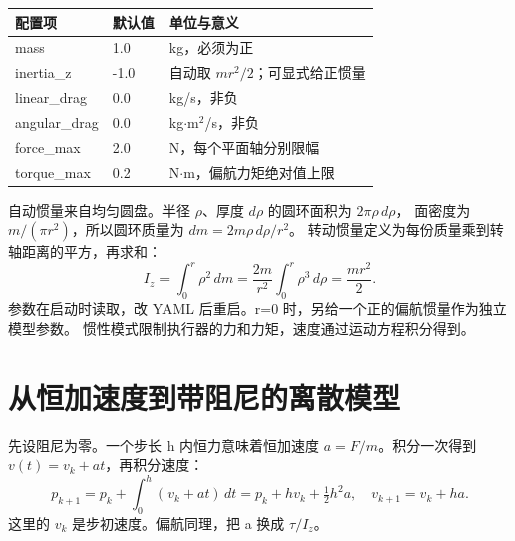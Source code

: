 \begin{center}
\begin{tabular}{lll}
\toprule
配置项 & 默认值 & 单位与意义\\
\midrule
mass & 1.0 & kg，必须为正\\
inertia\_z & -1.0 & 自动取 $mr^2/2$；可显式给正惯量\\
linear\_drag & 0.0 & kg/s，非负\\
angular\_drag & 0.0 & kg$\cdot$m$^2$/s，非负\\
force\_max & 2.0 & N，每个平面轴分别限幅\\
torque\_max & 0.2 & N$\cdot$m，偏航力矩绝对值上限\\
\bottomrule
\end{tabular}
\end{center}
自动惯量来自均匀圆盘。半径 $\rho$、厚度 $d\rho$ 的圆环面积为 $2\pi\rho\,d\rho$，
面密度为 $m/(\pi r^2)$，所以圆环质量为 $dm=2m\rho\,d\rho/r^2$。
转动惯量定义为每份质量乘到转轴距离的平方，再求和：
\begin{equation}
I_z=\int_0^r\rho^2\,dm=\frac{2m}{r^2}\int_0^r\rho^3\,d\rho=\frac{mr^2}{2}.
\end{equation}
参数在启动时读取，改 YAML 后重启。r=0 时，另给一个正的偏航惯量作为独立模型参数。
惯性模式限制执行器的力和力矩，速度通过运动方程积分得到。

\section{从恒加速度到带阻尼的离散模型}
先设阻尼为零。一个步长 h 内恒力意味着恒加速度 $a=F/m$。积分一次得到
$v(t)=v_k+at$，再积分速度：
\begin{equation}
p_{k+1}=p_k+\int_0^h(v_k+at)\,dt=p_k+hv_k+\tfrac12h^2a,
\quad v_{k+1}=v_k+ha.
\end{equation}
这里的 $v_k$ 是步初速度。偏航同理，把 a 换成 $\tau/I_z$。

